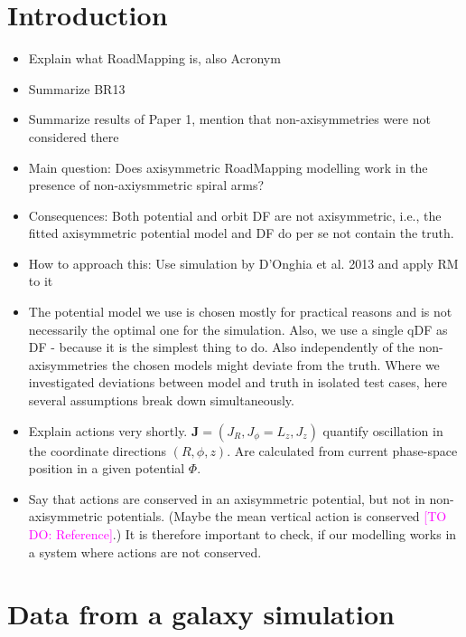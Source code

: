 \documentclass[iop,revtex4,numberedappendix,appendixfloats]{emulateapj}
\newcommand{\vect}[1]{\boldsymbol{#1}}
\newcommand{\Wilma}[1]{\textcolor{Magenta}{#1}}
\begin{document}
\section{Introduction}

\begin{itemize}
\item Explain what RoadMapping is, also Acronym
\item Summarize BR13
\item Summarize results of Paper 1, mention that non-axisymmetries were not considered there
\item Main question: Does axisymmetric RoadMapping modelling work in the presence of non-axiysmmetric spiral arms?
\item Consequences: Both potential and orbit DF are not axisymmetric, i.e., the fitted axisymmetric potential model and DF do per se not contain the truth.
\item How to approach this: Use simulation by D'Onghia et al. 2013 and apply RM to it
\item The potential model we use is chosen mostly for practical reasons and is not necessarily the optimal one for the simulation. Also, we use a single qDF as DF - because it is the simplest thing to do. Also independently of the non-axisymmetries the chosen models might deviate from the truth. Where we investigated deviations between model and truth in isolated test cases, here several assumptions break down simultaneously.
\item Explain actions very shortly. $\vect{J}=(J_R,J_\phi=L_z,J_z)$ quantify oscillation in the coordinate directions $(R,\phi,z)$. Are calculated from current phase-space position in a given potential $\Phi$.
\item Say that actions are conserved in an axisymmetric potential, but not in non-axisymmetric potentials. (Maybe the mean vertical action is conserved \Wilma{[TO DO: Reference]}.) It is therefore important to check, if our modelling works in a system where actions are not conserved.
\end{itemize}

\section{Data from a galaxy simulation} \label{sec:simulation}
\end{document}
